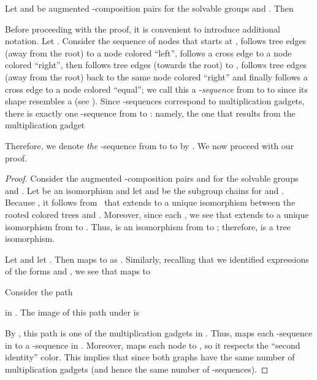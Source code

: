 \begin{lemma}
  \label{lem:X-functor}
  Let  and  be augmented -composition pairs for the solvable groups  and .  Then 
\end{lemma}

Before proceeding with the proof, it is convenient to introduce additional notation.  Let .  Consider the sequence of nodes that starts at , follows tree edges (away from the root) to a node colored ``left'', follows a cross edge to a node colored ``right'', then follows tree edges (towards the root) to , follows tree edges (away from the root) back to the same node colored ``right'' and finally follows a cross edge to a node colored ``equal''; we call this a -\emph{sequence} from  to  to  since its shape resembles a  (see ).  Since -sequences correspond to multiplication gadgets, there is exactly one -sequence from  to : namely, the one that results from the multiplication gadget

Therefore, we denote \emph{the} -sequence from  to  to  by .  We now proceed with our proof.

\begin{proof}
  Consider the augmented -composition pairs  and  for the solvable groups  and .  Let  be an isomorphism and let  and  be the subgroup chains for  and .  Because , it follows from~ that  extends to a unique isomorphism between the rooted colored trees  and .  Moreover, since each , we see that  extends to a unique isomorphism from  to .  Thus,  is an isomorphism from  to ; therefore,  is a tree isomorphism.

  Let  and let .  Then  maps  to  as .  Similarly, recalling that we identified expressions of the forms  and , we see that  maps  to 

  Consider the path
  
  in .  The image of this path under  is
  
  By , this path is one of the multiplication gadgets in .  Thus,  maps each -sequence in  to a -sequence in .  Moreover,
  maps each node  to , so it respects the ``second identity'' color.  This implies that  since both graphs have the same number of multiplication gadgets (and hence the same number of -sequences).
\end{proof}

